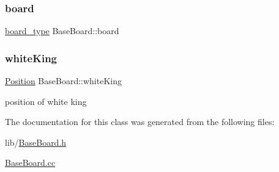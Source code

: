 \subsubsection{\texorpdfstring{board}{board}}
{\footnotesize\ttfamily \hyperlink{_a_i_class_8h_a6e73002e9c84a7986c39d7e80e83dc8d}{board\+\_\+type} Base\+Board\+::board\hspace{0.3cm}{\ttfamily [private]}}

\mbox{\label{class_base_board_a684c71ad408d12f6faf66298c1aeeabc}} 
\subsubsection{\texorpdfstring{white\+King}{whiteKing}}
{\footnotesize\ttfamily \hyperlink{struct_position}{Position} Base\+Board\+::white\+King\hspace{0.3cm}{\ttfamily [private]}}



position of white king 



The documentation for this class was generated from the following files\+:\begin{DoxyCompactItemize}
\item 
lib/\hyperlink{_base_board_8h}{Base\+Board.\+h}\item 
\hyperlink{_base_board_8cc}{Base\+Board.\+cc}\end{DoxyCompactItemize}
